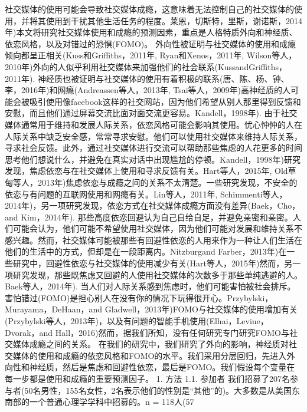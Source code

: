 社交媒体的使用可能会导致社交媒体成瘾，这意味着无法控制自己的社交媒体的使用，并将其使用到干扰其他生活任务的程度。莱恩，切斯特，里斯，谢诺斯，2014年)本文将研究社交媒体使用和成瘾的预测因素，重点是人格特质外向和神经质、依恋风格，以及对错过的恐惧(FOMO)。
外向性被证明与社交媒体的使用和成瘾倾向都呈正相关(Kuss和Griffiths，2011年, Ryan和Xenos，2011年, Wilson等人，2010年)外向的人似乎利用社交媒体来加强他们的社会联系(KussandGriffiths，2011年). 神经质也被证明与社交媒体的使用有着积极的联系(唐、陈、杨、钟、李，2016年)和网瘾(Andreassen等人，2013年, Tsai等人，2009年)高神经质的人可能会被吸引使用像facebook这样的社交网站，因为他们希望从别人那里得到反馈和安慰，而且他们通过屏幕交流比面对面交流更容易。Kandell，1998年).
由于社交媒体通常用于维持和发展人际关系，依恋风格可能会影响其使用。忧心忡忡的人在人际关系中缺乏安全感，常常寻求安慰。他们可以使用社交媒体来维持人际关系，寻求社会反馈。此外，通过社交媒体进行交流可以帮助那些焦虑的人花更多的时间思考他们想说什么，并避免在真实对话中出现尴尬的停顿。Kandell，1998年)研究发现，焦虑依恋与在社交媒体上使用和寻求反馈有关。Hart等人，2015年, Old草甸等人，2013年)焦虑依恋与成瘾之间的关系不太清楚。一些研究发现，不安全的依恋与有问题的互联网使用和网瘾有关。Lin等人，2011年, Schimmenti等人，2014年)，另一项研究发现，依恋方式在社交媒体成瘾方面没有差异(Baek，Cho，and Kim，2014年).
那些高度依恋回避认为自己自给自足，并避免亲密和亲密。人们可能会认为，他们可能不希望使用社交媒体，因为他们可能对发展和维持关系不感兴趣。然而，社交媒体可能被那些有回避性依恋的人用来作为一种让人们生活在他们的生活中的方式，但却是在一段距离内。Nitzburgand Farber，2013年)在一些研究中，回避性依恋与社交媒体的使用减少有关(Hart等人，2015年)然而，另一项研究发现，那些既焦虑又回避的人使用社交媒体的次数多于那些单纯逃避的人。Baek等人，2014年).
当人们对人际关系感到焦虑时，他们可能害怕被社会排斥。害怕错过(FOMO)是担心别人在没有你的情况下玩得很开心。Przybylski，Murayama，DeHaan，and Gladwell，2013年)FOMO与社交媒体的使用增加有关(Przybylski等人，2013年)，以及有问题的智能手机使用(Elhai，Levine，Dvorak，and Hall，2016)然而，据我们所知，没有任何研究专门研究FOMO与社交媒体成瘾之间的关系。
在我们的研究中，我们研究了外向的影响，神经质对社交媒体的使用和成瘾的依恋风格和FOMO的水平。我们采用分层回归，先进入外向性和神经质，然后是焦虑和回避性依恋，最后是FOMO。我们假设每个变量在每一步都是使用和成瘾的重要预测因子。
1. 方法
1.1. 参加者
我们招募了207名参与者(50名男性，155名女性，2名表示他们的性别是“其他”的)。大多数是从美国东南部的一个普通心理学学科中招募的。n = 118人(57%
